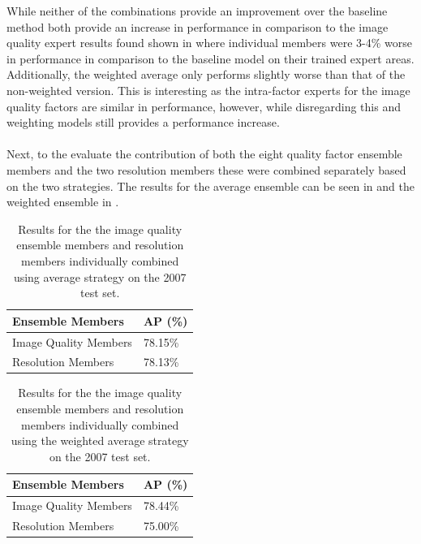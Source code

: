 While neither of the combinations provide an improvement over the baseline method both provide an increase in performance in comparison to the image quality expert results found shown in  where individual members were 3-4\% worse in performance in comparison to the baseline model on their trained expert areas. Additionally, the weighted average only performs slightly worse than that of the non-weighted version. This is interesting as the intra-factor experts for the image quality factors are similar in performance, however, while disregarding this and weighting models still provides a performance increase.
\\\\
Next, to the evaluate the contribution of both the eight quality factor ensemble members and the two resolution members these were combined separately based on the two strategies. The results for the average ensemble can be seen in  and the weighted ensemble in .

\begin{table}[h]
\centering
\caption{Results for the the image quality ensemble members and resolution members individually combined using average strategy on the 2007 test set.}
\label{tab:avgresind}
\begin{tabular}{|l|l|}
\hline
\textbf{Ensemble Members}        & \textbf{AP (\%)} \\ \hline
Image Quality Members & 78.15\% \\ \hline
Resolution Members    & 78.13\% \\ \hline
\end{tabular}
\end{table}

\begin{table}[h]
\centering
\caption{Results for the the image quality ensemble members and resolution members individually combined using the weighted average strategy on the 2007 test set.}
\label{tab:weiavgind}
\begin{tabular}{|l|l|}
\hline
\textbf{Ensemble Members}        & \textbf{AP (\%)} \\ \hline
Image Quality Members & 78.44\% \\ \hline
Resolution Members    & 75.00\% \\ \hline
\end{tabular}
\end{table}

